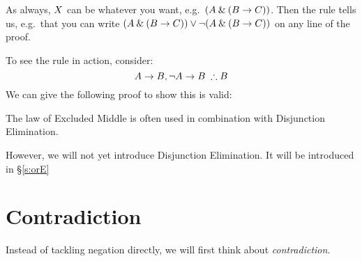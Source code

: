 As always, $X$ can be whatever you want, e.g.~$(A\mathbin{\&}(B\rightarrow C))$. Then the rule tells us, e.g.~that you can write $(A\mathbin{\&}(B\rightarrow C))\vee\neg(A\mathbin{\&}(B\rightarrow C))$ on any line of the proof. 


To see the rule in action, consider:
$$A\eif B,\enot A\eif B\;\therefore B$$
We can give the following proof to show this is valid:
\begin{pf}
	\LEM
\end{pf}
The law of Excluded Middle is often used in combination with Disjunction Elimination. 

However, we will not yet introduce Disjunction Elimination. It will be introduced in \S\ref{s:orE}


%
%
%
%
%



\section{Contradiction}
Instead of tackling negation directly, we will first think about \emph{contradiction}.  

